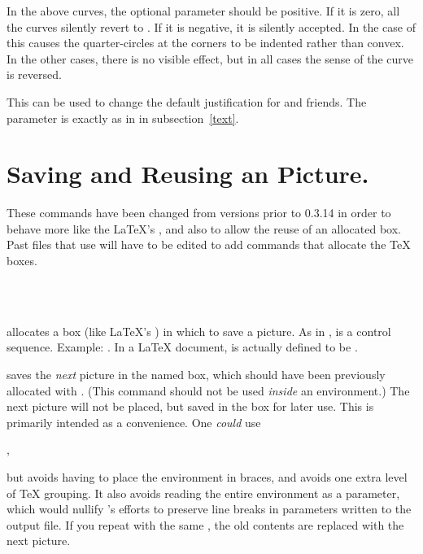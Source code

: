 \documentclass[letterpaper]{article}
\begin{document}
In the above  curves, the optional parameter should be
positive. If it is zero, all the curves silently revert to
. If it is negative, it is silently accepted. In the case
of  this causes the quarter-circles at the corners to be
indented rather than convex. In the other cases, there is no visible
effect, but in all cases the sense of the curve is reversed.

\begin{cd}
%
\end{cd}

This can be used to change the default justification for 
and friends. The  parameter is exactly as in
 in subsection~\ref{text}.


\section{Saving and Reusing an \mfp{} Picture.}\label{saving}

These commands have been changed from versions prior to 0.3.14 in order
to behave more like the \LaTeX{}'s , and also to allow the
reuse of an allocated box. Past files that use  will have to
be edited to add  commands that allocate the \TeX{}
boxes.

\begin{cd}
\\
\\
%
%
%
\end{cd}

 allocates a box (like \LaTeX{}'s ) in which
to save a picture. As in ,  is a control
sequence. Example: . In a \LaTeX{}
document,  is actually defined to be .

 saves the \emph{next}  picture in the named box,
which should have been previously allocated with . (This
command should not be used \emph{inside} an  environment.)
The next picture will not be placed, but saved in the box for later use.
This is primarily intended as a convenience. One \emph{could} use
\begin{ex}
  ,
\end{ex}
but  avoids having to place the  environment in
braces, and avoids one extra level of \TeX{} grouping. It also avoids
reading the entire  environment as a parameter, which would
nullify \mfp{}'s efforts to preserve line breaks in parameters
written to the \MF{} output file. If you repeat  with the
same , the old contents are replaced with the next
picture.
\end{document}
